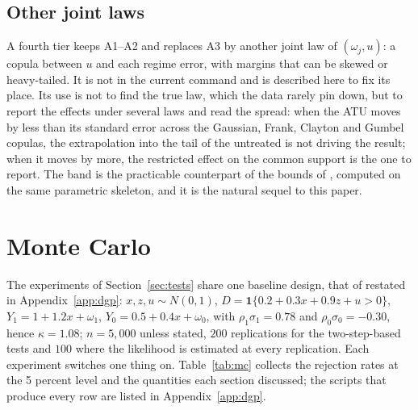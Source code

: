 \documentclass[11pt,a4paper]{article}
\theoremstyle{plain}
\theoremstyle{definition}
\theoremstyle{remark}
\newcommand{\1}{\mathbf{1}}
\begin{document}
\subsection{Other joint laws}\label{sec:est:copula}

A fourth tier keeps A1--A2 and replaces A3 by another joint law of
$(\omega_j,u)$: a copula between $u$ and each regime error, with margins
that can be skewed or heavy-tailed. It is not in the current command
and is described here to fix its place. Its use is not to find the true
law, which the data rarely pin down, but to report the effects under
several laws and read the spread: when the ATU moves by less than its
standard error across the Gaussian, Frank, Clayton and Gumbel copulas,
the extrapolation into the tail of the untreated is not driving the
result; when it moves by more, the restricted effect on the common
support is the one to report. The band is the practicable counterpart
of the bounds of \citet{mogstad2018}, computed on the same parametric
skeleton, and it is the natural sequel to this paper.

\section{Monte Carlo}\label{sec:mc}

The experiments of Section~\ref{sec:tests} share one baseline design,
that of \citet{araar2026sog} restated in Appendix~\ref{app:dgp}:
$x,z,u\sim N(0,1)$, $D=\1\{0.2+0.3x+0.9z+u>0\}$, $Y_1=1+1.2x+\omega_1$,
$Y_0=0.5+0.4x+\omega_0$, with $\rho_1\sigma_1=0.78$ and
$\rho_0\sigma_0=-0.30$, hence $\kappa=1.08$; $n=5{,}000$ unless stated,
$200$ replications for the two-step-based tests and $100$ where the
likelihood is estimated at every replication. Each experiment switches
one thing on. Table~\ref{tab:mc} collects the rejection rates at the 5
percent level and the quantities each section discussed; the scripts
that produce every row are listed in Appendix~\ref{app:dgp}.
\end{document}
